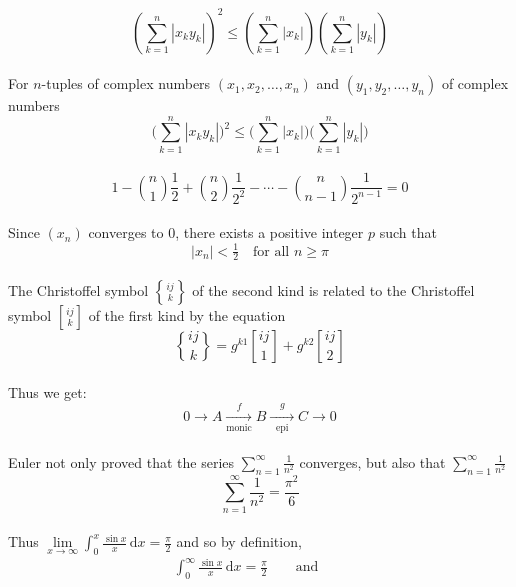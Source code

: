 \documentclass{article}
\theoremstyle{definition}
\theoremstyle{remark}
\theoremstyle{plain}
\numberwithin{equation}{subsection}
\begin{document}
{\begin{equation*}
\left(\sum_{k=1}^n|x_ky_k|\right)^2\le
\left(\sum_{k=1}^{n}|x_k|\right)\left(\sum_{k=1}^{n}|y_k|\right)
\end{equation*}\\
For $n$-tuples of complex numbers $(x_1,x_2,\dotsc,x_n)$ and
$(y_1,y_2,\dotsc,y_n)$ of complex numbers
\begin{equation*}
\biggl(\sum_{k=1}^n|x_ky_k|\biggr)^2\le
\biggl(\sum_{k=1}^{n}|x_k|\biggr)\biggl(\sum_{k=1}^{n}|y_k|\biggr)
\end{equation*}\\
\begin{equation}
1-\binom{n}{1}\frac{1}{2}+\binom{n}{2}\frac{1}{2^2}-\dotsb
-\binom{n}{n-1}\frac{1}{2^{n-1}}=0
\end{equation}\\
Since $(x_n)$ converges to $0$, there exists a positive integer $p$
such that
\begin{equation*}
|x_n|<\tfrac{1}{2}\quad\text{for all $n\ge \pi$}
\end{equation*}\\
\newcommand{\abc}[2]{\genfrac{[}{]}{0pt}{}{#1}{#2}}
\newcommand{\chssk}[2]{\genfrac{\{}{\}}{0pt}{}{#1}{#2}}
The Christoffel symbol $\genfrac{\{}{\}}{0pt}{}{ij}{k}$ of the second
kind is related to the Christoffel symbol $\genfrac{[}{]}{0pt}{}{ij}{k}$
of the first kind by the equation
\begin{equation*}
\chssk{ij}{k}=g^{k1}\abc{ij}{1}+g^{k2}\abc{ij}{2}
\end{equation*}\\
Thus we get:
\begin{equation*}
0\xrightarrow{} A\xrightarrow[\text{monic}]{f}
B\xrightarrow[\hspace{7pt}\text{epi}\hspace{7pt}]{g}
C\xrightarrow{}0
\end{equation*}\\
Euler not only proved that the series
$\displaystyle\sum_{n=1}^\infty\frac{1}{n^2}$ converges, but also that $\sum_{n=1}^\infty\frac{1}{n^2}$
\begin{equation*}
\sum_{n=1}^\infty\frac{1}{n^2}=\frac{\pi^2}{6}
\end{equation*}\\
Thus
$\lim\limits_{x\to\infty}\int_0^x\frac{\sin x}{x}\,\mathrm{d}x
=\frac{\pi}{2}$
and so by definition,
\begin{align*}
\int_0^\infty\frac{\sin x}{x}\,\mathrm{d}x=\frac{\pi}{2}
\qquad\text{and}\qquad

\end{align*}}
\end{document}
